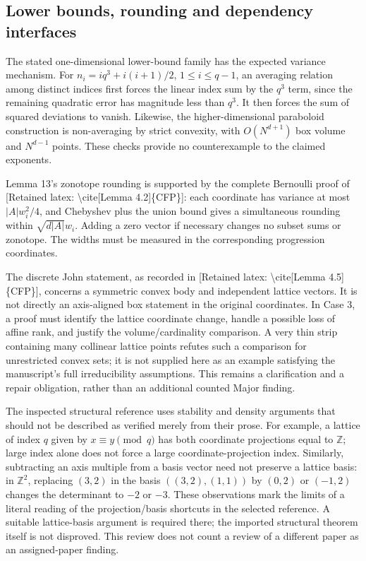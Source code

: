 \documentclass[10pt]{article}
\begin{document}
\subsection*{Lower bounds, rounding and dependency interfaces}
The stated one-dimensional lower-bound family has the expected variance mechanism. For \(n_i=iq^3+i(i+1)/2\), \(1\le i\le q-1\), an averaging relation among distinct indices first forces the linear index sum by the \(q^3\) term, since the remaining quadratic error has magnitude less than \(q^3\). It then forces the sum of squared deviations to vanish. Likewise, the higher-dimensional paraboloid construction is non-averaging by strict convexity, with \(O(N^{d+1})\) box volume and \(N^{d-1}\) points. These checks provide no counterexample to the claimed exponents.\par
Lemma 13’s zonotope rounding is supported by the complete Bernoulli proof of [Retained latex: \textbackslash{}cite[Lemma 4.2]\{CFP\}]: each coordinate has variance at most \(|A|w_i^2/4\), and Chebyshev plus the union bound gives a simultaneous rounding within \(\sqrt{d|A|}w_i\). Adding a zero vector if necessary changes no subset sums or zonotope. The widths must be measured in the corresponding progression coordinates.\par
The discrete John statement, as recorded in [Retained latex: \textbackslash{}cite[Lemma 4.5]\{CFP\}], concerns a symmetric convex body and independent lattice vectors. It is not directly an axis-aligned box statement in the original coordinates. In Case 3, a proof must identify the lattice coordinate change, handle a possible loss of affine rank, and justify the volume/cardinality comparison. A very thin strip containing many collinear lattice points refutes such a comparison for unrestricted convex sets; it is not supplied here as an example satisfying the manuscript’s full irreducibility assumptions. This remains a clarification and a repair obligation, rather than an additional counted Major finding.\par
The inspected structural reference uses stability and density arguments that should not be described as verified merely from their prose. For example, a lattice of index \(q\) given by \(x\equiv y\pmod q\) has both coordinate projections equal to \(\mathbb Z\); large index alone does not force a large coordinate-projection index. Similarly, subtracting an axis multiple from a basis vector need not preserve a lattice basis: in \(\mathbb Z^2\), replacing \((3,2)\) in the basis \(((3,2),(1,1))\) by \((0,2)\) or \((-1,2)\) changes the determinant to \(-2\) or \(-3\). These observations mark the limits of a literal reading of the projection/basis shortcuts in the selected reference. A suitable lattice-basis argument is required there; the imported structural theorem itself is not disproved. This review does not count a review of a different paper as an assigned-paper finding.\par
\end{document}
